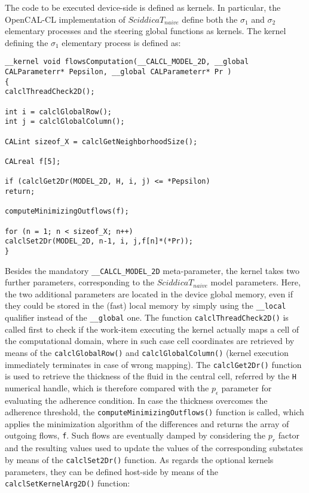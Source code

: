 The code to be executed device-side is defined as kernels. In
particular, the OpenCAL-CL implementation of $SciddicaT_{naive}$
define both the $\sigma_1$ and $\sigma_2$ elementary processes and
the steering global functions as kernels. The kernel defining the
$\sigma_1$ elementary process is defined as:
\begin{lstlisting}[basicstyle=\footnotesize, numbers=none]
__kernel void flowsComputation(__CALCL_MODEL_2D, __global CALParameterr* Pepsilon, __global CALParameterr* Pr )
{
calclThreadCheck2D();

int i = calclGlobalRow();
int j = calclGlobalColumn();

CALint sizeof_X = calclGetNeighborhoodSize();

CALreal f[5];

if (calclGet2Dr(MODEL_2D, H, i, j) <= *Pepsilon)
return;

computeMinimizingOutflows(f);

for (n = 1; n < sizeof_X; n++)
calclSet2Dr(MODEL_2D, n-1, i, j,f[n]*(*Pr));
}
\end{lstlisting}

\noindent Besides the mandatory \verb'__CALCL_MODEL_2D'
meta-parameter, the kernel takes two further parameters,
corresponding to the $SciddicaT_{naive}$ model parameters. Here, the
two additional parameters are located in the device global memory,
even if they could be stored in the (fast) local memory by simply
using the \verb'__local' qualifier instead of the \verb'__global'
one. The function \verb'calclThreadCheck2D()' is called first to
check if the work-item executing the kernel actually maps a cell of
the computational domain, where in such case cell coordinates are
retrieved by means of the \verb'calclGlobalRow()' and
\verb'calclGlobalColumn()' (kernel execution immediately terminates
in case of wrong mapping). The \verb'calclGet2Dr()' function is used
to retrieve the thickness of the fluid in the central cell, referred
by the \verb'H' numerical handle, which is therefore compared with
the $p_\epsilon$ parameter for evaluating the adherence
condition. In case the thickness overcomes the adherence threshold,
the \verb'computeMinimizingOutflows()' function is called, which
applies the minimization algorithm of the differences and returns
the array of outgoing flows, \verb'f'. Such flows are eventually
damped by considering the $p_r$ factor and the resulting values used
to update the values of the corresponding substates by means of the
\verb'calclSet2Dr()' function. As regards the optional kernels
parameters, they can be defined host-side by means of the
\verb'calclSetKernelArg2D()' function:

